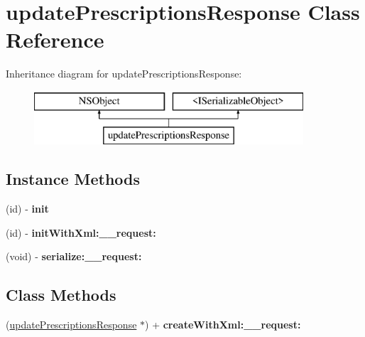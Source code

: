 \hypertarget{interfaceupdate_prescriptions_response}{}\section{update\+Prescriptions\+Response Class Reference}
\label{interfaceupdate_prescriptions_response}
Inheritance diagram for update\+Prescriptions\+Response\+:\begin{figure}[H]
\begin{center}
\leavevmode
\includegraphics[height=2.000000cm]{interfaceupdate_prescriptions_response}
\end{center}
\end{figure}
\subsection*{Instance Methods}
\begin{DoxyCompactItemize}
\item 
\hypertarget{interfaceupdate_prescriptions_response_ab5d6893a828189c2c2021613178c2182}{}(id) -\/ {\bfseries init}\label{interfaceupdate_prescriptions_response_ab5d6893a828189c2c2021613178c2182}

\item 
\hypertarget{interfaceupdate_prescriptions_response_a02ae2a0beba3575a317788b5d059f9cf}{}(id) -\/ {\bfseries init\+With\+Xml\+:\+\_\+\+\_\+request\+:}\label{interfaceupdate_prescriptions_response_a02ae2a0beba3575a317788b5d059f9cf}

\item 
\hypertarget{interfaceupdate_prescriptions_response_ab9f5e86a596ddaf293703055c3a25c10}{}(void) -\/ {\bfseries serialize\+:\+\_\+\+\_\+request\+:}\label{interfaceupdate_prescriptions_response_ab9f5e86a596ddaf293703055c3a25c10}

\end{DoxyCompactItemize}
\subsection*{Class Methods}
\begin{DoxyCompactItemize}
\item 
\hypertarget{interfaceupdate_prescriptions_response_ace55ca09d6caa8d3d93022bbee343072}{}(\hyperlink{interfaceupdate_prescriptions_response}{update\+Prescriptions\+Response} $\ast$) + {\bfseries create\+With\+Xml\+:\+\_\+\+\_\+request\+:}\label{interfaceupdate_prescriptions_response_ace55ca09d6caa8d3d93022bbee343072}

\end{DoxyCompactItemize}
